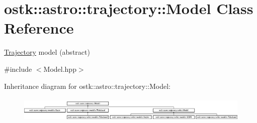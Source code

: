 \hypertarget{classostk_1_1astro_1_1trajectory_1_1_model}{}\section{ostk\+:\+:astro\+:\+:trajectory\+:\+:Model Class Reference}
\label{classostk_1_1astro_1_1trajectory_1_1_model}


\hyperlink{classostk_1_1astro_1_1_trajectory}{Trajectory} model (abstract)  




{\ttfamily \#include $<$Model.\+hpp$>$}

Inheritance diagram for ostk\+:\+:astro\+:\+:trajectory\+:\+:Model\+:\begin{figure}[H]
\begin{center}
\leavevmode
\includegraphics[height=1.230769cm]{classostk_1_1astro_1_1trajectory_1_1_model}
\end{center}
\end{figure}
